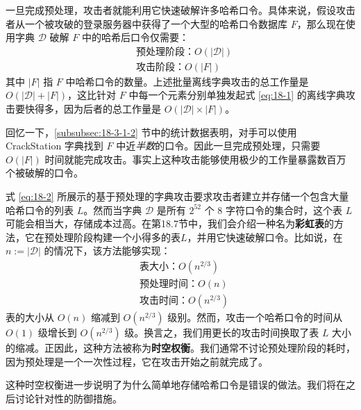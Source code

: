 \begin{snote}[批量离线字典攻击.]
一旦完成预处理，攻击者就能利用它快速破解许多哈希口令。具体来说，假设攻击者从一个被攻破的登录服务器中获得了一个大型的哈希口令数据库 $F$，那么现在使用字典 $\mathcal{D}$ 破解 $F$ 中的哈希后口令仅需要：
\begin{equation}
	\begin{aligned}
		& \text{预处理阶段：}O(|\mathcal{D}|)\\
		& \text{攻击阶段：}O(|F|)
	\end{aligned}
\end{equation}
其中 $|F|$ 指 $F$ 中哈希口令的数量。上述批量离线字典攻击的总工作量是 $O(|\mathcal{D}|+|F|)$，这比针对 $F$ 中每一个元素分别单独发起式 \ref{eq:18-1} 的离线字典攻击要快得多，因为后者的总工作量是 $O(|\mathcal{D}|\times |F|)$。

回忆一下，\ref{subsubsec:18-3-1-2} 节中的统计数据表明，对手可以使用 CrackStation 字典找到 $F$ 中近\emph{半数}的口令。因此一旦完成预处理，只需要 $O(|F|)$ 时间就能完成攻击。事实上这种攻击能够使用极少的工作量暴露数百万个被破解的口令。
\end{snote}

\begin{snote}[时空权衡.]
式 \ref{eq:18-2} 所展示的基于预处理的字典攻击要求攻击者建立并存储一个包含大量哈希口令的列表 $L$。然而当字典 $\mathcal{D}$ 是所有 $2^{52}$ 个 8 字符口令的集合时，这个表 $L$ 可能会相当大，存储成本过高。在第18.7节中，我们会介绍一种名为\textbf{彩虹表}的方法，它在预处理阶段构建一个小得多的表$L$，并用它快速破解口令。比如说，在 $n:=|\mathcal{D}|$ 的情况下，该方法能够实现：
\begin{equation*}
	\begin{aligned}
		& \text{表大小：}O(n^{2/3})\\
		& \text{预处理时间：}O(n)\\
		& \text{攻击时间：}O(n^{2/3})
	\end{aligned}
\end{equation*}
表的大小从 $O(n)$ 缩减到 $O(n^{2/3})$ 级别。然而，攻击一个哈希口令的时间从 $O(1)$ 级增长到 $O(n^{2/3})$ 级。换言之，我们用更长的攻击时间换取了表 $L$ 大小的缩减。正因此，这种方法被称为\textbf{时空权衡}。我们通常不讨论预处理阶段的耗时，因为预处理是一个一次性过程，它在攻击开始之前就完成了。

这种时空权衡进一步说明了为什么简单地存储哈希口令是错误的做法。我们将在之后讨论针对性的防御措施。
\end{snote}